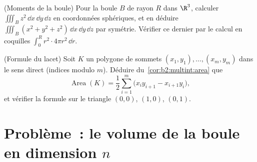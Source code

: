 \begin{exercise}[$\star\star$]\label{exo:b2:multint:11}
(Moments de la boule) Pour la boule $B$ de rayon $R$ dans
$\R^3$, calculer $\iiint_B z^2\,\dd x\,\dd y\,\dd z$ en
coordonnées sphériques, et en déduire $\iiint_B (x^2 + y^2 +
z^2)\,\dd x\,\dd y\,\dd z$ par symétrie. Vérifier ce
dernier par le calcul en coquilles $\int_0^R r^2\cdot4\pi
r^2\,\dd r$.
\end{exercise}

\begin{exercise}[$\star\star$]\label{exo:b2:multint:12}
(Formule du lacet) Soit $K$ un polygone de sommets $(x_1,
y_1), \dots, (x_m, y_m)$ dans le sens direct (indices
modulo $m$). Déduire du~\cref{cor:b2:multint:area} que
\[
\operatorname{Area}(K)
= \frac12\sum_{i=1}^m
\bigl(x_iy_{i+1} - x_{i+1}y_i\bigr) ,
\]
et vérifier la formule sur le triangle $(0,0)$, $(1,0)$,
$(0,1)$.
\end{exercise}

\section{Problème~: le volume de la boule en dimension $n$}

